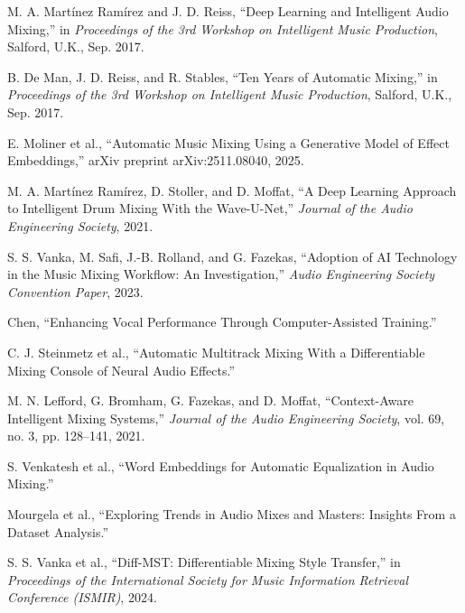 \documentclass[12pt]{article}
\begin{document}
\begin{enumerate}[label={[\arabic*]}, leftmargin=1.6cm]
\item M. A. Martínez Ramírez and J. D. Reiss, ``Deep Learning and Intelligent Audio Mixing,'' in \textit{Proceedings of the 3rd Workshop on Intelligent Music Production}, Salford, U.K., Sep. 2017.

\item B. De Man, J. D. Reiss, and R. Stables, ``Ten Years of Automatic Mixing,'' in \textit{Proceedings of the 3rd Workshop on Intelligent Music Production}, Salford, U.K., Sep. 2017.

\item E. Moliner et al., ``Automatic Music Mixing Using a Generative Model of Effect Embeddings,'' arXiv preprint arXiv:2511.08040, 2025.

\item M. A. Martínez Ramírez, D. Stoller, and D. Moffat, ``A Deep Learning Approach to Intelligent Drum Mixing With the Wave-U-Net,'' \textit{Journal of the Audio Engineering Society}, 2021.

\item S. S. Vanka, M. Safi, J.-B. Rolland, and G. Fazekas, ``Adoption of AI Technology in the Music Mixing Workflow: An Investigation,'' \textit{Audio Engineering Society Convention Paper}, 2023.

\item Chen, ``Enhancing Vocal Performance Through Computer-Assisted Training.''

\item C. J. Steinmetz et al., ``Automatic Multitrack Mixing With a Differentiable Mixing Console of Neural Audio Effects.''

\item M. N. Lefford, G. Bromham, G. Fazekas, and D. Moffat, ``Context-Aware Intelligent Mixing Systems,'' \textit{Journal of the Audio Engineering Society}, vol. 69, no. 3, pp. 128--141, 2021.

\item S. Venkatesh et al., ``Word Embeddings for Automatic Equalization in Audio Mixing.''

\item Mourgela et al., ``Exploring Trends in Audio Mixes and Masters: Insights From a Dataset Analysis.''

\item S. S. Vanka et al., ``Diff-MST: Differentiable Mixing Style Transfer,'' in \textit{Proceedings of the International Society for Music Information Retrieval Conference (ISMIR)}, 2024.
\end{enumerate}
\end{document}
